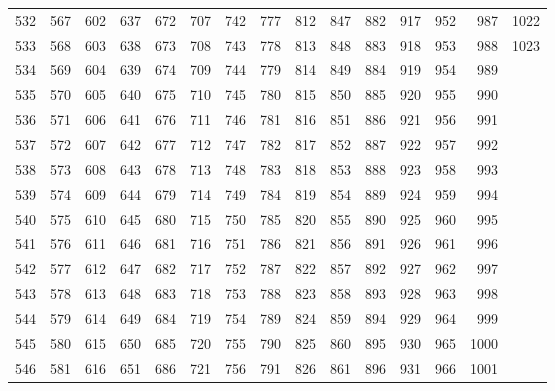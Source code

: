 \documentclass{assignment}
\begin{document}
\begin{tabular}{r r r r r r r r r r r r r r r}
532 & 567 & 602 & 637 & 672 & 707 & 742 & 777 & 812 & 847 & 882 & 917 & 952 & 987 & 1022 \\
533 & 568 & 603 & 638 & 673 & 708 & 743 & 778 & 813 & 848 & 883 & 918 & 953 & 988 & 1023 \\
534 & 569 & 604 & 639 & 674 & 709 & 744 & 779 & 814 & 849 & 884 & 919 & 954 & 989 \\
535 & 570 & 605 & 640 & 675 & 710 & 745 & 780 & 815 & 850 & 885 & 920 & 955 & 990 \\
536 & 571 & 606 & 641 & 676 & 711 & 746 & 781 & 816 & 851 & 886 & 921 & 956 & 991 \\
537 & 572 & 607 & 642 & 677 & 712 & 747 & 782 & 817 & 852 & 887 & 922 & 957 & 992 \\
538 & 573 & 608 & 643 & 678 & 713 & 748 & 783 & 818 & 853 & 888 & 923 & 958 & 993 \\
539 & 574 & 609 & 644 & 679 & 714 & 749 & 784 & 819 & 854 & 889 & 924 & 959 & 994 \\
540 & 575 & 610 & 645 & 680 & 715 & 750 & 785 & 820 & 855 & 890 & 925 & 960 & 995 \\
541 & 576 & 611 & 646 & 681 & 716 & 751 & 786 & 821 & 856 & 891 & 926 & 961 & 996 \\
542 & 577 & 612 & 647 & 682 & 717 & 752 & 787 & 822 & 857 & 892 & 927 & 962 & 997 \\
543 & 578 & 613 & 648 & 683 & 718 & 753 & 788 & 823 & 858 & 893 & 928 & 963 & 998 \\
544 & 579 & 614 & 649 & 684 & 719 & 754 & 789 & 824 & 859 & 894 & 929 & 964 & 999 \\
545 & 580 & 615 & 650 & 685 & 720 & 755 & 790 & 825 & 860 & 895 & 930 & 965 & 1000 \\
546 & 581 & 616 & 651 & 686 & 721 & 756 & 791 & 826 & 861 & 896 & 931 & 966 & 1001 \\
\end{tabular}
\newpage
\end{document}

